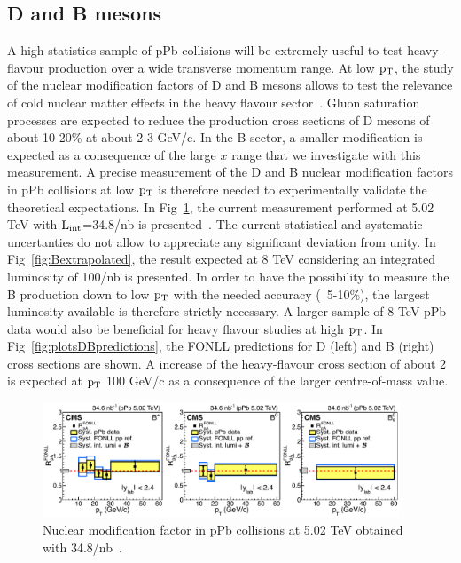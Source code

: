 \subsection{D and B mesons}
A high statistics sample of pPb collisions will be extremely useful to test heavy-flavour production over a wide transverse momentum range.
At low $\rm p_{T}$, the study of the nuclear modification factors of D and B mesons allows to test the relevance of cold nuclear matter effects in the 
heavy flavour sector~\cite{Eskola:2009uj,deFlorian:2003qf,Frankfurt:2011cs}. Gluon saturation processes are expected to reduce the production 
cross sections of D mesons of about 10-20$\%$ at about 2-3 GeV/c.  
In the B sector, a smaller modification is expected as a consequence of the large $x$ range that we investigate with this measurement.
A precise measurement of the D and B nuclear modification factors in pPb collisions at low $\rm p_{T}$ is therefore needed to experimentally validate
the theoretical expectations.
In Fig~\ref{fig:measurementB}, the current measurement performed at 5.02 TeV with  $\rm L_{int}$=34.8/nb is presented~\cite{PhysRevLett.116.032301}. The current statistical 
and systematic uncertanties do not allow to appreciate any significant deviation from unity. In Fig~\ref{fig:Bextrapolated}, the result expected at 8 TeV
considering an integrated luminosity of 100/nb is presented. In order to have the possibility to measure the B production down to low $\rm p_{T}$ with the needed accuracy (~5-10$\%$), 
the largest luminosity available is therefore strictly necessary.  A larger sample of 8 TeV pPb data would also be beneficial for heavy flavour studies at high $\rm p_{T}$.  In Fig~\ref{fig:plotsDBpredictions}, 
the FONLL predictions for D (left) and B (right) cross sections are shown. A  increase of the heavy-flavour cross section of about 2 is
expected at $\rm p_{T}~$100 GeV/c as a consequence of the larger centre-of-mass value. 

\begin{figure}[h]
\begin{center}
\includegraphics[width= 0.95\textwidth]{figures/nuclearmodification.pdf}
\caption{Nuclear modification factor in pPb collisions at 5.02 TeV obtained with 34.8/nb~\cite{PhysRevLett.116.032301}.}
\label{fig:measurementB}
\end{center}
\end{figure}



